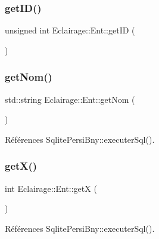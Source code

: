 \mbox{\label{classEclairage_1_1Ent_a503507f6dc76a84b54e22ef21d9f301d}} 
\subsubsection{\texorpdfstring{get\+I\+D()}{getID()}}
{\footnotesize\ttfamily unsigned int Eclairage\+::\+Ent\+::get\+ID (\begin{DoxyParamCaption}{ }\end{DoxyParamCaption})\hspace{0.3cm}{\ttfamily [virtual]}}

\mbox{\label{classEclairage_1_1Ent_ae440f0f45ec8f6d11e54c1a0ebe8d5c1}} 
\subsubsection{\texorpdfstring{get\+Nom()}{getNom()}}
{\footnotesize\ttfamily std\+::string Eclairage\+::\+Ent\+::get\+Nom (\begin{DoxyParamCaption}{ }\end{DoxyParamCaption})\hspace{0.3cm}{\ttfamily [virtual]}}



Références Sqlite\+Persi\+Bny\+::executer\+Sql().

\mbox{\label{classEclairage_1_1Ent_a0b54632cd5ff1bcb588c4f8527361990}} 
\subsubsection{\texorpdfstring{get\+X()}{getX()}}
{\footnotesize\ttfamily int Eclairage\+::\+Ent\+::getX (\begin{DoxyParamCaption}{ }\end{DoxyParamCaption})\hspace{0.3cm}{\ttfamily [virtual]}}



Références Sqlite\+Persi\+Bny\+::executer\+Sql().


